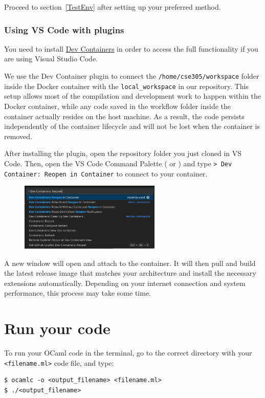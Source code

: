 \documentclass{extarticle}
\begin{document}
Proceed to section~\ref{TestEnv} after setting up your preferred method.

\subsubsection{Using VS Code with plugins}
You need to install
\href{https://marketplace.visualstudio.com/items?itemName=ms-vscode-remote.remote-containers}{Dev Containers}
in order to access the full functionality if you are using Visual Studio Code.

We use the Dev Container plugin to connect the \texttt{/home/cse305/workspace} folder inside the Docker container with the \texttt{local\_workspace} in our repository.
This setup allows most of the compilation and development work to happen within the Docker container,
while any code saved in the workflow folder inside the container actually resides on the host machine.
As a result, the code persists independently of the container lifecycle and will not be lost when the container is removed.

After installing the plugin, open the repository folder you just cloned in VS Code\@.
Then, open the VS Code Command Palette ( or ) and
type \texttt{> Dev Container: Reopen in Container} to connect to your container.

\begin{figure}[H]
  \centering
  \includegraphics[width=0.6\textwidth]{vscode_cmd_pat.png}
\end{figure}

A new window will open and attach to the container. It will then pull and build the latest release image that matches your architecture and install the necessary extensions automatically.
Depending on your internet connection and system performance, this process may take some time.

\newpage
\section{Run your code}\label{CompileRun}
To run your OCaml code in the terminal, go to the correct directory with your \texttt{<filename.ml>} code file, and type:
\begin{lstlisting}
$ ocamlc -o <output_filename> <filename.ml>
$ ./<output_filename>
\end{lstlisting}
\end{document}
